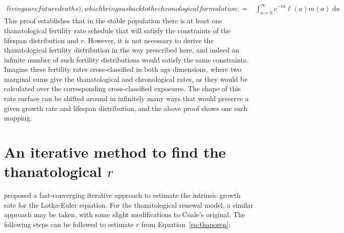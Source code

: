 \documentclass[12pt,oneside,a4paper,leqno]{article}
\newcommand{\dd}{\; \mathrm{d}}
\begin{document}
\begin{appendices}
\begin{align}
{livings are future deaths), which brings us back to the chronological
formulation:} =& \int_{a=0}^\infty e^{-ra}\ell(a)m(a)
\dd a
\end{align}
This proof establishes that in the stable population there is at least
one thanatological fertility rate schedule that will satisfy the constraints of
the lifespan distribution and $r$. However, it is not necessary to derive the
thanatological fertility distribution in the way prescribed here, and indeed an
infinite number of such fertility distributions would satisfy the same
constraints. Imagine these fertility rates cross-classified in
both age dimensions, where two marginal sums give the thanatological and
chronological rates, as they would be calculated over the
corresponding cross-classified exposures. The shape of this rate surface can be
shifted around in infinitely many ways that would preserve a given growth rate
and lifespan distribution, and the above proof shows one such mapping.

\section{An iterative method to find the thanatological $r$}
\label{app:C}
\citet{coale1957new} proposed a fast-converging iterative approach to estimate
the intrinsic growth rate for the Lotka-Euler equation. For the thanatological
renewal model, a similar approach may be taken, with some slight
modifications to Coale's original.
The following steps can be followed to estimate $r$ from
Equation~\eqref{eq:thanoren}:


\end{appendices}
\end{document}
